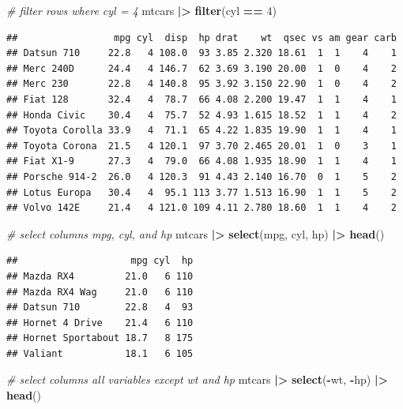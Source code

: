 \documentclass[
  12pt,
  oneside]{book}
\newenvironment{Shaded}{\begin{snugshade}}{\end{snugshade}}
\newcommand{\CommentTok}[1]{\textcolor[rgb]{0.56,0.35,0.01}{\textit{#1}}}
\newcommand{\DecValTok}[1]{\textcolor[rgb]{0.00,0.00,0.81}{#1}}
\newcommand{\FunctionTok}[1]{\textcolor[rgb]{0.13,0.29,0.53}{\textbf{#1}}}
\newcommand{\NormalTok}[1]{#1}
\newcommand{\SpecialCharTok}[1]{\textcolor[rgb]{0.81,0.36,0.00}{\textbf{#1}}}
\begin{document}
\begin{Shaded}
\begin{Highlighting}[]
\CommentTok{\# filter rows where cyl = 4}
\NormalTok{mtcars }\SpecialCharTok{|\textgreater{}} 
  \FunctionTok{filter}\NormalTok{(cyl }\SpecialCharTok{==} \DecValTok{4}\NormalTok{)}
\end{Highlighting}
\end{Shaded}

\begin{verbatim}
##                 mpg cyl  disp  hp drat    wt  qsec vs am gear carb
## Datsun 710     22.8   4 108.0  93 3.85 2.320 18.61  1  1    4    1
## Merc 240D      24.4   4 146.7  62 3.69 3.190 20.00  1  0    4    2
## Merc 230       22.8   4 140.8  95 3.92 3.150 22.90  1  0    4    2
## Fiat 128       32.4   4  78.7  66 4.08 2.200 19.47  1  1    4    1
## Honda Civic    30.4   4  75.7  52 4.93 1.615 18.52  1  1    4    2
## Toyota Corolla 33.9   4  71.1  65 4.22 1.835 19.90  1  1    4    1
## Toyota Corona  21.5   4 120.1  97 3.70 2.465 20.01  1  0    3    1
## Fiat X1-9      27.3   4  79.0  66 4.08 1.935 18.90  1  1    4    1
## Porsche 914-2  26.0   4 120.3  91 4.43 2.140 16.70  0  1    5    2
## Lotus Europa   30.4   4  95.1 113 3.77 1.513 16.90  1  1    5    2
## Volvo 142E     21.4   4 121.0 109 4.11 2.780 18.60  1  1    4    2
\end{verbatim}

\begin{Shaded}
\begin{Highlighting}[]
\CommentTok{\# select columns mpg, cyl, and hp}
\NormalTok{mtcars }\SpecialCharTok{|\textgreater{}} 
  \FunctionTok{select}\NormalTok{(mpg, cyl, hp) }\SpecialCharTok{|\textgreater{}} 
  \FunctionTok{head}\NormalTok{()}
\end{Highlighting}
\end{Shaded}

\begin{verbatim}
##                    mpg cyl  hp
## Mazda RX4         21.0   6 110
## Mazda RX4 Wag     21.0   6 110
## Datsun 710        22.8   4  93
## Hornet 4 Drive    21.4   6 110
## Hornet Sportabout 18.7   8 175
## Valiant           18.1   6 105
\end{verbatim}

\begin{Shaded}
\begin{Highlighting}[]
\CommentTok{\# select columns all variables except wt and hp}
\NormalTok{mtcars }\SpecialCharTok{|\textgreater{}} 
  \FunctionTok{select}\NormalTok{(}\SpecialCharTok{{-}}\NormalTok{wt, }\SpecialCharTok{{-}}\NormalTok{hp) }\SpecialCharTok{|\textgreater{}} 
  \FunctionTok{head}\NormalTok{()}
\end{Highlighting}
\end{Shaded}
\end{document}
